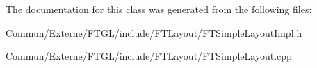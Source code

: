 The documentation for this class was generated from the following files\+:\begin{DoxyCompactItemize}
\item 
Commun/\+Externe/\+F\+T\+G\+L/include/\+F\+T\+Layout/F\+T\+Simple\+Layout\+Impl.\+h\item 
Commun/\+Externe/\+F\+T\+G\+L/include/\+F\+T\+Layout/F\+T\+Simple\+Layout.\+cpp\end{DoxyCompactItemize}
